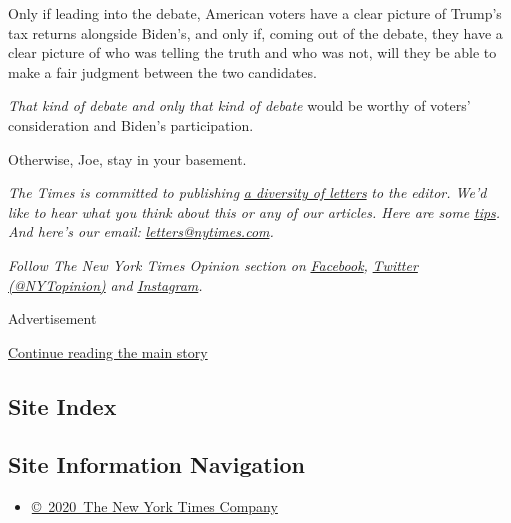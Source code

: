 Only if leading into the debate, American voters have a clear picture of
Trump's tax returns alongside Biden's, and only if, coming out of the
debate, they have a clear picture of who was telling the truth and who
was not, will they be able to make a fair judgment between the two
candidates.

\emph{That kind of debate} \emph{and only that kind of debate} would be
worthy of voters' consideration and Biden's participation.

Otherwise, Joe, stay in your basement.

\emph{The Times is committed to publishing}
\href{https://www.nytimes.com/2019/01/31/opinion/letters/letters-to-editor-new-york-times-women.html}{\emph{a
diversity of letters}} \emph{to the editor. We'd like to hear what you
think about this or any of our articles. Here are some}
\href{https://help.nytimes.com/hc/en-us/articles/115014925288-How-to-submit-a-letter-to-the-editor}{\emph{tips}}\emph{.
And here's our email:}
\href{mailto:letters@nytimes.com}{\emph{letters@nytimes.com}}\emph{.}

\emph{Follow The New York Times Opinion section on}
\href{https://www.facebook.com/nytopinion}{\emph{Facebook}}\emph{,}
\href{http://twitter.com/NYTOpinion}{\emph{Twitter (@NYTopinion)}}
\emph{and}
\href{https://www.instagram.com/nytopinion/}{\emph{Instagram}}\emph{.}

Advertisement

\protect\hyperlink{after-bottom}{Continue reading the main story}

\hypertarget{site-index}{%
\subsection{Site Index}\label{site-index}}

\hypertarget{site-information-navigation}{%
\subsection{Site Information
Navigation}\label{site-information-navigation}}

\begin{itemize}
\tightlist
\item
  \href{https://help.nytimes.com/hc/en-us/articles/115014792127-Copyright-notice}{©~2020~The
  New York Times Company}
\end{itemize}

